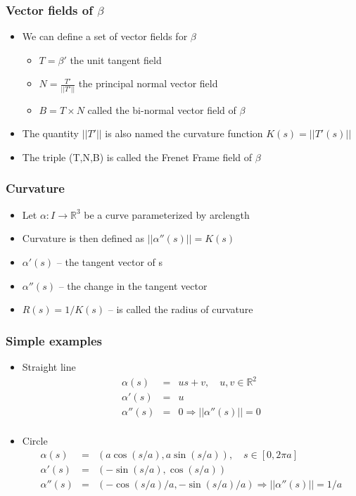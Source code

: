 \documentclass[10pt]{beamer}
\begin{document}
\begin{frame}
  \frametitle{Vector fields of $\beta$}
  \begin{itemize}
  \item We can define a set of vector fields for $\beta$
    \begin{itemize}
    \item $T = \beta'$ the unit tangent field
    \item $N = \frac{T'}{||T'||}$ the principal normal vector field
    \item $B = T \times N$ called the bi-normal vector field of $\beta$
    \end{itemize}
  \item The quantity $||T'||$ is also named the curvature function $K(s) = ||T'(s)||$
  \item The triple (T,N,B) is called the Frenet Frame field of $\beta$
  \end{itemize}
\end{frame}

\begin{frame}
  \frametitle{Curvature}
  \begin{itemize}
  \item Let $\alpha: I \rightarrow \mathbb{R}^3$ be a curve parameterized by arclength
  \item Curvature is then defined as $||\alpha''(s)|| = K(s)$
  \item $\alpha'(s)$ -- the tangent vector of s
  \item $\alpha''(s)$ -- the change in the tangent vector 
  \item $R(s) = 1/K(s)$ -- is called the radius of curvature
  \end{itemize}
\end{frame}

\begin{frame}
  \frametitle{Simple examples}
  \begin{itemize}
  \item Straight line
    \[
      \begin{array}{rcl}
        \alpha(s)   & = & us + v, \mbox{~~~} u,v \in \mathbb{R}^2\\
        \alpha'(s)  & = & u\\
        \alpha''(s) & = & 0 \Rightarrow ||\alpha''(s)|| = 0\\
      \end{array}
    \]
  \item Circle
    \[
      \begin{array}{rcl}
        \alpha(s)   & = & (a \cos (s/a), a \sin (s/a)), \mbox{~~~} s \in [0,2 \pi a]\\
        \alpha'(s)  & = & ( -\sin(s/a), \cos (s/a))\\
        \alpha''(s) & = & (-\cos (s/a) / a, -\sin(s/a) / a) \Rightarrow ||\alpha''(s)|| = 1/a\\
      \end{array}
    \]
  \end{itemize}
\end{frame}
\end{document}
